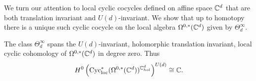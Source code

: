We turn our attention to local cyclic cocycles defined on affine space $\mathbb C^d$ that are both translation invariant and $U(d)$-invariant. 
We show that up to homotopy there is a unique such cyclic cocycle on the local algebra  $\Omega^{0,*}(\mathbb C^d)$ given by $\Theta^\infty_d$. 

\begin{prop}
The class $\Theta^\infty_d$ spans the $U(d)$-invariant, holomorphic translation invariant, local cyclic cohomology of $\Omega^{0,*}(\mathbb C^d)$ in degree zero.
Thus
\[
H^0\left({\rm Cyc}_{\rm loc}^*(\Omega^{0,*}(\mathbb C^d))^{\mathbb C^d_{hol}} \right)^{U(d)} \cong \mathbb C .
\] 
\end{prop}

